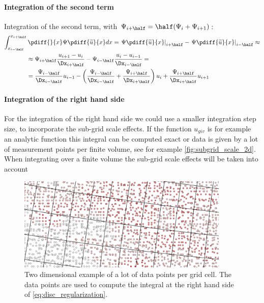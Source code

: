 \paragraph*{Integration of the second term}
Integration of the second term, with $\Psi_{i+\half} = \half(\Psi_{i} + \Psi_{i+1})$:
\begin{align}
\int_{x_{i-\half}}^{x_{i+\half}} &\, \pdiff{}{x} \Psi \pdiff{\widetilde u}{x} dx  =
\left. \Psi \pdiff{\widetilde u}{x} \right|_{i+\half} -  \left. \Psi \pdiff{\widetilde u}{x} \right|_{i-\half} \approx \\
& \approx \Psi_{i+\half} \frac{ u_{i+1} -  u_{i}}{\Dx_{i+\half}} - \Psi_{i-\half} \frac{ u_{i} -  u_{i-1}}{\Dx_{i-\half}} = \\
&=  \frac{\Psi_{i-\half}}{\Dx_{i-\half}}   u_{i-1}
-  \left( \frac{\Psi_{i-\half}}{{\Dx_{i-\half}}}
+  \frac{\Psi_{i+\half}}{{\Dx_{i+\half}}} \right)  u_{i}
+ \frac{\Psi_{i+\half}}{{\Dx_{i+\half}}}   u_{i+1}
\end{align}
\paragraph*{Integration of the right hand side}
For the integration of the right hand side we could use a smaller integration step size, to incorporate the sub-grid scale effects.
If the function $u_{giv}$ is for example an analytic function this integral can be computed exact or data is given by a lot of measurement points per finite volume, see for example \autoref{fig:subgrid_scale_2d}.
When integrating over a finite volume the sub-grid scale effects will be taken into account
\begin{figure}[H]
    \centering
    \includegraphics[width=0.9\textwidth]{figures/subgrid_scale_2d.png}
    \caption{Two dimensional example of a lot of data points per grid cell. The data points are used to compute the integral at the right hand side of \autoref{eq:disc_regularization}. \label{fig:subgrid_scale_2d}}
\end{figure}

